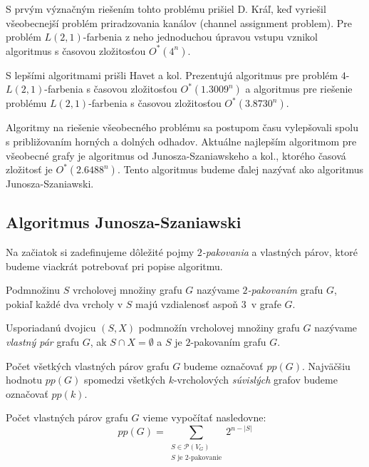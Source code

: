 S prvým význačným riešením tohto problému prišiel D. Kráľ, keď vyriešil všeobecnejší problém
priradzovania kanálov (channel assignment problem). Pre problém $L(2,1)$-farbenia z neho 
jednoduchou úpravou vstupu vznikol algoritmus s časovou zložitosťou $O^*(4^n)$\cite{kral_channel}.

S lepšími algoritmami prišli Havet a kol. Prezentujú algoritmus pre problém $4$-$L(2,1)$-farbenia
s časovou zložitosťou $O^*(1.3009^n)$ a algoritmus pre riešenie problému $L(2,1)$-farbenia s
časovou zložitosťou $O^*(3.8730^n)$.

Algoritmy na riešenie všeobecného problému sa postupom času vylepšovali spolu s približovaním
horných a dolných odhadov. Aktuálne najlepším algoritmom pre všeobecné grafy je algoritmus
od Junosza-Szaniawskeho a kol., ktorého časová zložitosť je $O^*(2.6488^n)$\cite{junosza_fast}.
Tento algoritmus budeme ďalej nazývať ako algoritmus Junosza-Szaniawski.

\subsection{Algoritmus Junosza-Szaniawski}

Na začiatok si zadefinujeme dôležité pojmy $2$\emph{-pakovania} a vlastných párov, ktoré budeme
viackrát potrebovať pri popise algoritmu.

\begin{defn}
    Podmnožinu $S$ vrcholovej množiny grafu $G$ nazývame $2$\emph{-pakovaním} grafu $G$, pokiaľ každé
    dva vrcholy v $S$ majú vzdialenosť aspoň $3$ v grafe $G$.
\end{defn}

\begin{defn}
    Usporiadanú dvojicu $(S, X)$ podmnožín vrcholovej množiny grafu $G$ nazývame \emph{vlastný pár}
    grafu $G$, ak $S \cap X = \emptyset$ a $S$ je $2$-pakovaním grafu $G$.

    Počet všetkých vlastných párov grafu $G$ budeme označovať $pp(G)$. Najväčšiu hodnotu $pp(G)$
    spomedzi všetkých $k$-vrcholových \emph{súvislých} grafov budeme označovať $pp(k)$.
\end{defn}

\begin{pozn}
    \label{pp_g}
    Počet vlastných párov grafu $G$ vieme vypočítať nasledovne:
    $$pp(G) = \sum_{\substack{S \in \mathcal{P}(V_G) \\ S \textrm{ je } 2 \textrm{-pakovanie}}} 2^{n - |S|}$$
\end{pozn}

